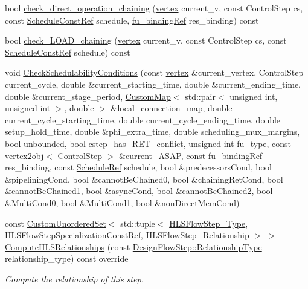 \begin{DoxyCompactItemize}
\item 
bool \hyperlink{classparametric__list__based_a9fc96b3511360dc67e2cff71077a8d80}{check\+\_\+direct\+\_\+operation\+\_\+chaining} (\hyperlink{graph_8hpp_abefdcf0544e601805af44eca032cca14}{vertex} current\+\_\+v, const Control\+Step cs, const \hyperlink{schedule_8hpp_a85e4dea8a1611026193d8ca13fc5a260}{Schedule\+Const\+Ref} schedule, \hyperlink{fu__binding_8hpp_a619181df8ab98d7b7e17de58ac44b065}{fu\+\_\+binding\+Ref} res\+\_\+binding) const
\item 
bool \hyperlink{classparametric__list__based_a582b8b501406c0dbd5245d1db2aa34a7}{check\+\_\+\+L\+O\+A\+D\+\_\+chaining} (\hyperlink{graph_8hpp_abefdcf0544e601805af44eca032cca14}{vertex} current\+\_\+v, const Control\+Step cs, const \hyperlink{schedule_8hpp_a85e4dea8a1611026193d8ca13fc5a260}{Schedule\+Const\+Ref} schedule) const
\item 
void \hyperlink{classparametric__list__based_a4ffd85836c234c7ded92b33e992f20bb}{Check\+Schedulability\+Conditions} (const \hyperlink{graph_8hpp_abefdcf0544e601805af44eca032cca14}{vertex} \&current\+\_\+vertex, Control\+Step current\+\_\+cycle, double \&current\+\_\+starting\+\_\+time, double \&current\+\_\+ending\+\_\+time, double \&current\+\_\+stage\+\_\+period, \hyperlink{custom__map_8hpp_a18ca01763abbe3e5623223bfe5aaac6b}{Custom\+Map}$<$ std\+::pair$<$ unsigned int, unsigned int $>$, double $>$ \&local\+\_\+connection\+\_\+map, double current\+\_\+cycle\+\_\+starting\+\_\+time, double current\+\_\+cycle\+\_\+ending\+\_\+time, double setup\+\_\+hold\+\_\+time, double \&phi\+\_\+extra\+\_\+time, double scheduling\+\_\+mux\+\_\+margins, bool unbounded, bool cstep\+\_\+has\+\_\+\+R\+E\+T\+\_\+conflict, unsigned int fu\+\_\+type, const \hyperlink{structvertex2obj}{vertex2obj}$<$ Control\+Step $>$ \&current\+\_\+\+A\+S\+AP, const \hyperlink{fu__binding_8hpp_a619181df8ab98d7b7e17de58ac44b065}{fu\+\_\+binding\+Ref} res\+\_\+binding, const \hyperlink{schedule_8hpp_af67f402958b3b52a1ec5cc4ce08ae3b9}{Schedule\+Ref} schedule, bool \&predecessors\+Cond, bool \&pipelining\+Cond, bool \&cannot\+Be\+Chained0, bool \&chaining\+Ret\+Cond, bool \&cannot\+Be\+Chained1, bool \&async\+Cond, bool \&cannot\+Be\+Chained2, bool \&Multi\+Cond0, bool \&Multi\+Cond1, bool \&non\+Direct\+Mem\+Cond)
\item 
const \hyperlink{classCustomUnorderedSet}{Custom\+Unordered\+Set}$<$ std\+::tuple$<$ \hyperlink{hls__step_8hpp_ada16bc22905016180e26fc7e39537f8d}{H\+L\+S\+Flow\+Step\+\_\+\+Type}, \hyperlink{hls__step_8hpp_a5fdd2edf290c196531d21d68e13f0e74}{H\+L\+S\+Flow\+Step\+Specialization\+Const\+Ref}, \hyperlink{hls__step_8hpp_a3ad360b9b11e6bf0683d5562a0ceb169}{H\+L\+S\+Flow\+Step\+\_\+\+Relationship} $>$ $>$ \hyperlink{classparametric__list__based_a677ad6063a17ccb5313d608c4009947c}{Compute\+H\+L\+S\+Relationships} (const \hyperlink{classDesignFlowStep_a723a3baf19ff2ceb77bc13e099d0b1b7}{Design\+Flow\+Step\+::\+Relationship\+Type} relationship\+\_\+type) const override
\begin{DoxyCompactList}\small\item\em Compute the relationship of this step. \end{DoxyCompactList}\end{DoxyCompactItemize}
